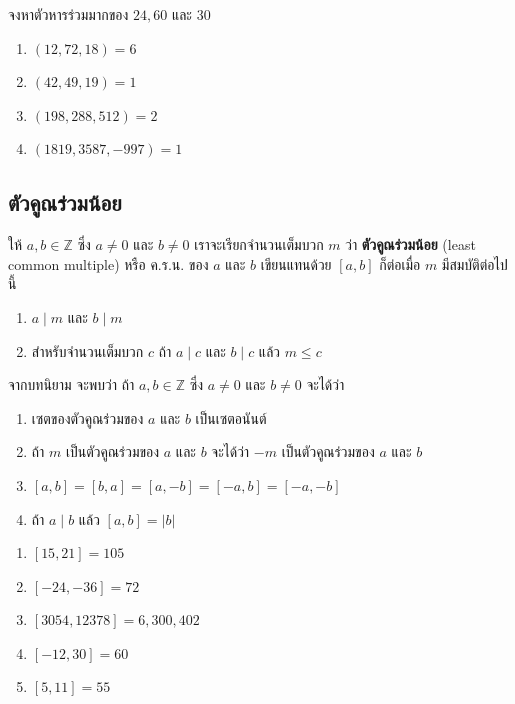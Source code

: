 		\begin{examplebox}
			จงหาตัวหารร่วมมากของ $24, 60$ และ $30$ 
		\end{examplebox}
		\solution
\vspace{5cm}		
		\begin{examplebox}
			\begin{enumerate}
				\item $(12, 72, 18) = 6$
				\item $(42, 49, 19) = 1$
				\item $(198, 288, 512) = 2$
				\item $(1819, 3587, -997) = 1$
			\end{enumerate}
		\end{examplebox}
\newpage
\subsection{ตัวคูณร่วมน้อย}
\begin{definitionbox}
	ให้ $a, b \in \mathbb{Z}$ ซึ่ง $a \neq 0$ และ $b \neq 0$ เราจะเรียกจำนวนเต็มบวก $m$ ว่า \textbf{ตัวคูณร่วมน้อย} (least common multiple) หรือ ค.ร.น. ของ $a$ และ $b$ เขียนแทนด้วย $[a, b]$ ก็ต่อเมื่อ $m$ มีสมบัติต่อไปนี้
	\begin{enumerate}
		\item $a \mid m$ และ $b \mid m$
		\item สำหรับจำนวนเต็มบวก $c$ ถ้า $a \mid c$ และ $b \mid c$ แล้ว $m \leq c$
	\end{enumerate}
\end{definitionbox}

\noindent จากบทนิยาม จะพบว่า ถ้า $a, b \in \mathbb{Z}$ ซึ่ง $a \neq 0$ และ $b \neq 0$ จะได้ว่า
\begin{enumerate}
	\item เซตของตัวคูณร่วมของ $a$ และ $b$ เป็นเซตอนันต์
	\item ถ้า $m$ เป็นตัวคูณร่วมของ $a$ และ $b$ จะได้ว่า $-m$ เป็นตัวคูณร่วมของ $a$ และ $b$
	\item $[a, b] = [b, a] = [a, -b] = [-a, b] = [-a, -b]$
	\item ถ้า $a \mid b$ แล้ว $[a, b] = |b|$
\end{enumerate}

\begin{examplebox}
	\begin{enumerate}
		\item $[15, 21] = 105$
		\item $[-24, -36] = 72$
		\item $[3054, 12378] = 6,300,402$
		\item $[-12, 30] = 60$
		\item $[5, 11] = 55$
	\end{enumerate}
\end{examplebox}

